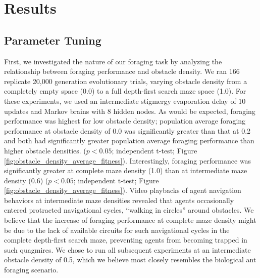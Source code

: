 \section{Results}

\subsection{Parameter Tuning}




First, we investigated the nature of our foraging task by analyzing the relationship between foraging performance and obstacle density.
We ran 166 replicate 20,000 generation evolutionary trials, varying obstacle density from a completely empty space (0.0) to a full depth-first search maze space (1.0).
For these experiments, we used an intermediate stigmergy evaporation delay of 10 updates and Markov brains with 8 hidden nodes.
As would be expected, foraging performance was highest for low obstacle density;
population average foraging performance at obstacle density of 0.0 was significantly greater than that at 0.2 and both had significantly greater population average foraging performance than higher obstacle densities.
($p < 0.05$; independent t-test; Figure \ref{fig:obstacle_density_average_fitness}).
Interestingly, foraging performance was significantly greater at complete maze density (1.0) than at intermediate maze density (0.6) ($p < 0.05$; independent t-test; Figure \ref{fig:obstacle_density_average_fitness}).
Video playbacks of agent navigation behaviors at intermediate maze densities revealed that agents occasionally entered protracted navigational cycles, ``walking in circles'' around obstacles.
We believe that the increase of foraging performance at complete maze density might be due to the lack of available circuits for such navigational cycles in the complete depth-first search maze, preventing agents from becoming trapped in such quagmires.
We chose to run all subsequent experiments at an intermediate obstacle density of 0.5, which we believe most closely resembles the biological ant foraging scenario.

